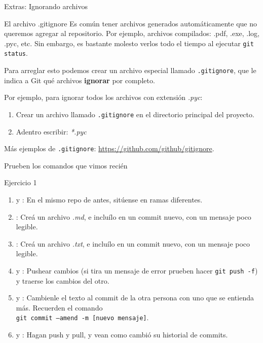 \begin{frame}[t]{Extras: Ignorando archivos}

    \begin{block}{El archivo .gitignore}
      Es común tener archivos generados automáticamente que no queremos agregar al repositorio. Por ejemplo, archivos compilados: .pdf, .exe, .log, .pyc, etc. Sin embargo, es bastante molesto verlos todo el tiempo al ejecutar \texttt{git status}.

      Para arreglar esto podemos crear un archivo especial llamado \texttt{.gitignore}, que le indica a Git qué archivos \textbf{ignorar} por completo.
    \end{block}

    \pause
    \begin{resumen}{}
      Por ejemplo, para ignorar todos los archivos con extensión \textit{.pyc}:
      \begin{enumerate}
        \item Crear un archivo llamado \texttt{.gitignore} en el directorio principal del proyecto.
        \item Adentro escribir: \textit{*.pyc}
      \end{enumerate}
      Más ejemplos de \texttt{.gitignore}: \url{https://github.com/github/gitignore}.
    \end{resumen}

\end{frame}

\begin{frame}{Prueben los comandos que vimos recién}
    \begin{ejercicio}{Ejercicio 1}
    \begin{enumerate}
        \item {} y : En el mismo repo de antes, sitúense en ramas diferentes.
        \item {}: Creá un archivo \textit{.md}, e incluílo en un commit nuevo, con un mensaje poco legible.
        \item {}: Creá un archivo \textit{.txt}, e incluílo en un commit nuevo, con un mensaje poco legible.
        \item {} y : Pushear cambios (si tira un mensaje de error prueben hacer \texttt{git push -f}) y traerse los cambios del otro. 
        \item {} y : Cambienle el texto al commit de la otra persona con uno que se entienda más. 
        Recuerden el comando\\ \texttt{git commit --amend -m [nuevo mensaje]}.
        \item {} y : Hagan push y pull, y vean como cambió su historial de commits.
    \end{enumerate}
    \end{ejercicio}
\end{frame}

